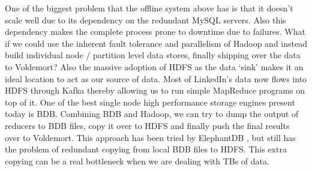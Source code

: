\documentclass[10pt,twocolumn,preprint,natbib,authoryear]{sigplanconf}
\begin{document}
One of the biggest problem that the offline system above has is that it doesn't scale well due to its dependency on the redundant MySQL servers. Also this dependency makes the complete process prone to downtime due to failures. What if we could use the inherent fault tolerance and parallelism of Hadoop and instead build individual node / partition level data stores, finally shipping over the data to Voldemort? Also the massive adoption of HDFS as the data `sink' makes it an ideal location to act as our source of data. Most of LinkedIn's data now flows into HDFS through Kafka thereby allowing us to run simple MapReduce programs on top of it. One of the best single node high performance storage engines present today is BDB. Combining BDB and Hadoop, we can try to dump the output of reducers to BDB files, copy it over to HDFS and finally push the final results over to Voldemort. This approach has been tried by ElephantDB \cite{elephantdb}, but still has the problem of redundant copying from local BDB files to HDFS. This extra copying can be a real bottleneck when we are dealing with TBs of data. 
\end{document}
